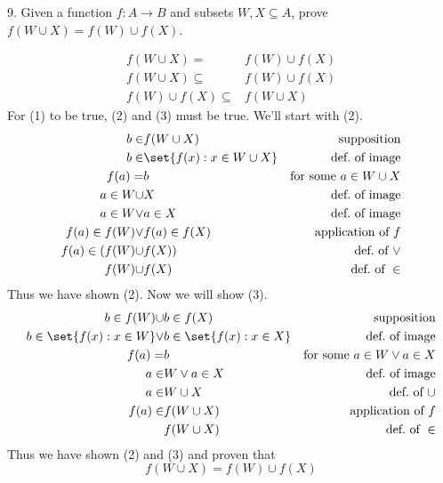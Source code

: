\documentclass{hippoidC}
\begin{document}
\begin{prooflist}{9. Given a function $f: A \rightarrow B$ and subsets $W, X
			\subseteq A$, prove $f(W \cup X)=f(W) \cup f(X)$.}
	\item \imagedef{}
	\setcounter{equation}{0}
	\begin{align}
		f(W \cup X)=             & f(W) \cup f(X) \\
		f(W \cup X)\subseteq     & f(W) \cup f(X) \\
		f(W) \cup f(X) \subseteq & f(W \cup X)
	\end{align}
	For (1) to be true, (2) and (3) must be true. We'll start with (2).
	\begin{align}
		b\in                & f(W\cup X)                & \text{supposition}           \\
		b\in                & \set{f(x): x \in W\cup X} & \text{def.\ of image}        \\
		f(a) =              & b                         & \text{for some }a\in W\cup X \\
		a \in W \cup        & X                         & \text{def.\ of image}        \\
		a \in W \lor        & a \in X                   & \text{def.\ of image}        \\
		f(a) \in f(W) \lor  & f(a) \in f(X)             & \text{application of }f      \\
		f(a) \in (f(W) \cup & f(X))                     & \text{def.\ of }\lor         \\
		f(W) \cup           & f(X)                      & \text{def.\ of }\in
	\end{align}
	Thus we have shown (2). Now we will show (3).
	\begin{align}
		b\in f(W)\cup                 & b\in f(X)                & \text{supposition}                \\
		b\in \set{f(x): x \in W} \lor & b\in \set{f(x): x \in X} & \text{def.\ of image}             \\
		f(a) =                        & b                        & \text{for some }a\in W\lor a\in X \\
		a \in                         & W \lor a \in X           & \text{def.\ of image}             \\
		a \in                         & W \cup X                 & \text{def.\ of }\cup              \\
		f(a) \in                      & f(W\cup X)               & \text{application of }f           \\
		                              & f(W\cup X)               & \text{def.\ of }\in
	\end{align}
	Thus we have shown (2) and (3) and proven that
	\[
		f(W \cup X)=f(W) \cup f(X)
	\]
\end{prooflist}
\end{document}
